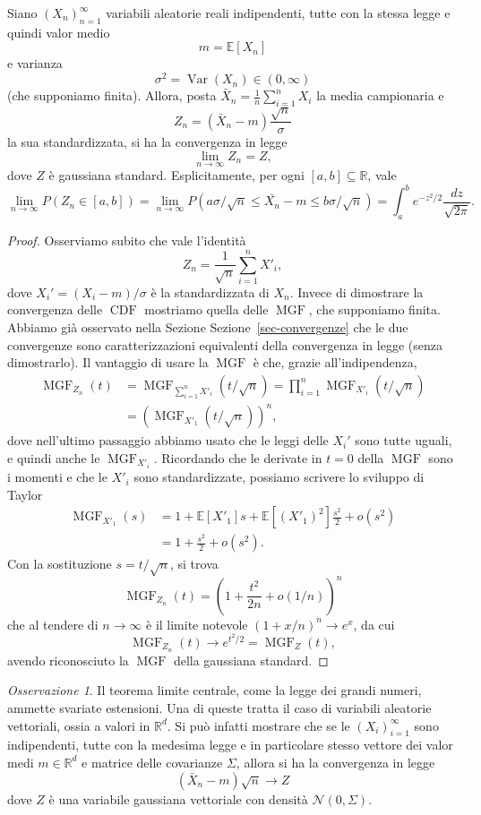 \documentclass[
  italian,
  letterpaper,
]{book}
\newcommand{\bra}[1]{\left( #1 \right)}
\newcommand{\sqa}[1]{\left[ #1 \right]}
\newcommand{\R}{\mathbb{R}}
\newcommand{\E}[1]{\mathbb{E}\sqa{#1}}
\newcommand{\Var}[1]{\operatorname{Var}\bra{#1}}
\newcommand{\CDF}{\operatorname{CDF}}
\newcommand{\MGF}{\operatorname{MGF}}
\theoremstyle{definition}
\theoremstyle{remark}
\newtheorem*{remark}{Osservazione}
\begin{document}
Siano \((X_n)_{n=1}^\infty\) variabili aleatorie reali indipendenti,
tutte con la stessa legge e quindi valor medio \[ m = \E{X_n}\] e
varianza \[\sigma^2 = \Var{X_n} \in (0, \infty)\] (che supponiamo
finita). Allora, posta \(\bar{X}_n = \frac{1}{n} \sum_{i=1}^n X_i\) la
media campionaria e \[Z_n = (\bar{X}_n  -m ) \frac{ \sqrt{ n}}{\sigma}\]
la sua standardizzata, si ha la convergenza in legge
\[ \lim_{n \to \infty }Z_n = Z,\] dove \(Z\) è gaussiana standard.
Esplicitamente, per ogni \([a,b] \subseteq \R\), vale
\[ \lim_{n \to \infty} P( Z_n \in [a,b]) =  \lim_{n \to \infty} P\bra{ a \sigma/\sqrt{n}\le  \bar{X_n} - m  \le b \sigma /\sqrt{n}} =   \int_a^b e^{-z^2/2} \frac{dz}{\sqrt{2 \pi}}.\]

\begin{proof}
Osserviamo subito che vale l'identità
\[ Z_n = \frac{1}{\sqrt {n}} \sum_{i=1}^n X'_i,\] dove
\(X_i' = (X_i - m)/\sigma\) è la standardizzata di \(X_n\). Invece di
dimostrare la convergenza delle \(\CDF\) mostriamo quella delle
\(\MGF\), che supponiamo finita. Abbiamo già osservato nella Sezione
Sezione~\ref{sec-convergenze} che le due convergenze sono
caratterizzazioni equivalenti della convergenza in legge (senza
dimostrarlo). Il vantaggio di usare la \(\MGF\) è che, grazie
all'indipendenza,
\[ \begin{split} \MGF_{Z_n}(t) & = \MGF_{\sum_{i=1}^n X'_i} (t/\sqrt{n}) = \prod_{i=1}^n \MGF_{X'_i}(t/\sqrt{n})\\
& =\bra{  \MGF_{X'_1}(t/\sqrt{n})}^n,\end{split}\] dove nell'ultimo
passaggio abbiamo usato che le leggi delle \(X_i'\) sono tutte uguali, e
quindi anche le \(\MGF_{X'_i}\). Ricordando che le derivate in \(t=0\)
della \(\MGF\) sono i momenti e che le \(X'_i\) sono standardizzate,
possiamo scrivere lo sviluppo di Taylor
\[\begin{split} \MGF_{X'_1}(s) & = 1 +  \E{X'_1} s  + \E{(X'_1)^2} \frac{s^2}{2} + o(s^2)\\
& = 1 + \frac{s^2}{2} + o(s^2).\end{split}\] Con la sostituzione
\(s = t/\sqrt{n}\), si trova
\[ \MGF_{Z_n}(t) = \bra{ 1 + \frac{t^2}{2 n} + o (1/n)}^n\] che al
tendere di \(n \to \infty\) è il limite notevole \((1+x/n)^n \to e^x\),
da cui \[ \MGF_{Z_n}(t)  \to e^{t^2/2} = \MGF_Z(t),\] avendo
riconosciuto la \(\MGF\) della gaussiana standard.
\end{proof}

\begin{remark}
Il teorema limite centrale, come la legge dei grandi numeri, ammette
svariate estensioni. Una di queste tratta il caso di variabili aleatorie
vettoriali, ossia a valori in \(\R^d\). Si può infatti mostrare che se
le \((X_i)_{i=1}^\infty\) sono indipendenti, tutte con la medesima legge
e in particolare stesso vettore dei valor medi \(m\in \R^d\) e matrice
delle covarianze \(\Sigma\), allora si ha la convergenza in legge
\[ \bra{ \bar{X}_n - m} \sqrt{n} \to Z\] dove \(Z\) è una variabile
gaussiana vettoriale con densità \(\mathcal{N}(0, \Sigma)\).
\end{remark}
\end{document}
